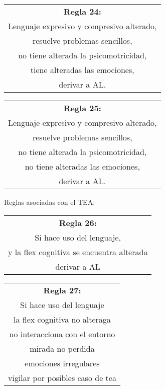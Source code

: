 \documentclass[letterpaper,12pt]{article}
\begin{document}
\begin{center}
	\begin{tabular}{|c|}
		\hline 
		\textbf{Regla 24:} \\
		Lenguaje expresivo y compresivo alterado,\\
		resuelve problemas sencillos,\\
		no tiene alterada la psicomotricidad,\\
		tiene alteradas las emociones,\\
		derivar a AL.\\
	\hline 
\end{tabular} 
\end{center}	
		
\begin{center}
	\begin{tabular}{|c|}
		\hline 
		\textbf{Regla 25:} \\
		Lenguaje expresivo y compresivo alterado, \\
		resuelve problemas sencillos,\\
		no tiene alterada la psicomotricidad, \\
		no tiene alteradas las emociones, \\
		derivar a AL. \\
	\hline 
\end{tabular} 
\end{center}	

Reglas asociadas con el TEA:
\begin{center}
	\begin{tabular}{|c|}
		\hline 
		\textbf{Regla 26:} \\
		Si hace uso del lenguaje,\\
		y la flex cognitiva se encuentra alterada\\
		derivar a AL\\
	\hline 
\end{tabular} 
\end{center}	
		
\begin{center}
	\begin{tabular}{|c|}
		\hline 
		\textbf{Regla 27:} \\
		Si hace uso del lenguaje\\
		la flex cognitiva no alteraga\\
		no interacciona con el entorno\\
		mirada no perdida\\
		emociones irregulares\\
		vigilar por posibles caso de tea\\
	\hline 
\end{tabular} 
\end{center}
	
\end{document}
